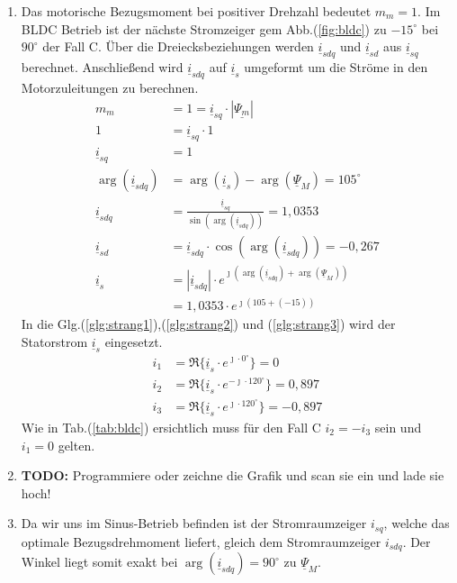 \begin{solution}
\begin{enumerate}
\item Das motorische Bezugsmoment bei positiver Drehzahl bedeutet $m_m = 1$. Im BLDC Betrieb ist der nächste Stromzeiger gem Abb.(\ref{fig:bldc}) zu $-15^\circ$ bei $90^\circ$ der Fall C. Über die Dreiecksbeziehungen werden $\underline{i}_{sdq}$ und $\underline{i}_{sd}$ aus $\underline{i}_{sq}$ berechnet. Anschließend wird $\underline{i}_{sdq}$ auf $\underline{i}_{s}$ umgeformt um die Ströme in den Motorzuleitungen zu berechnen.
\begin{align}
m_m &= 1 = \underline{i}_{sq} \cdot |\underline{\Psi_m}|\\
1 &= \underline{i}_{sq} \cdot 1\\
\underline{i}_{sq} &= 1\\
\arg(\underline{i}_{sdq}) &= \arg(\underline{i}_{s}) -\arg(\underline{\Psi}_{M})=105^\circ\\
\underline{i}_{sdq} &= \frac{\underline{i}_{sq}}{\sin(\arg(\underline{i}_{sdq}))}= 1,0353\\
\underline{i}_{sd} &= \underline{i}_{sdq} \cdot \cos(\arg(\underline{i}_{sdq})) = -0,267\\
\underline{i}_{s} &= |\underline{i}_{sdq}| \cdot e^{\jmath (\arg(\underline{i}_{sdq}) + \arg(\underline{\Psi}_{M}))}\\&= 1,0353 \cdot e^{\jmath ( 105 + (-15))}
\end{align}
In die Glg.(\ref{glg:strang1}),(\ref{glg:strang2}) und (\ref{glg:strang3}) wird der Statorstrom $\underline{i}_s$ eingesetzt.
\begin{align}
i_1 & = \Re \{ \underline{i}_s \cdot e^{\jmath \cdot 0 ^\circ} \} = 0\\
i_2 & = \Re \{ \underline{i}_s \cdot e^{-\jmath \cdot 120 ^\circ} \} = 0,897 \\
i_3 & = \Re \{ \underline{i}_s \cdot e^{\jmath \cdot 120 ^\circ} \}=  -0,897
\end{align}
Wie in Tab.(\ref{tab:bldc}) ersichtlich muss für den Fall C $i_2= -i_3$ sein und $i_1= 0$ gelten.
\item \textbf{TODO:} Programmiere oder zeichne die Grafik und scan sie ein und lade sie hoch!
\item	Da wir uns im Sinus-Betrieb befinden ist der Stromraumzeiger $i_{sq}$, welche das optimale Bezugsdrehmoment liefert, gleich dem Stromraumzeiger $i_{sdq}$. Der Winkel liegt somit exakt bei $\arg(\underline{i}_{sdq})=90^\circ$ zu $\underline{\Psi}_M$.
\begin{align}

\end{align}
\end{enumerate}
\end{solution}
